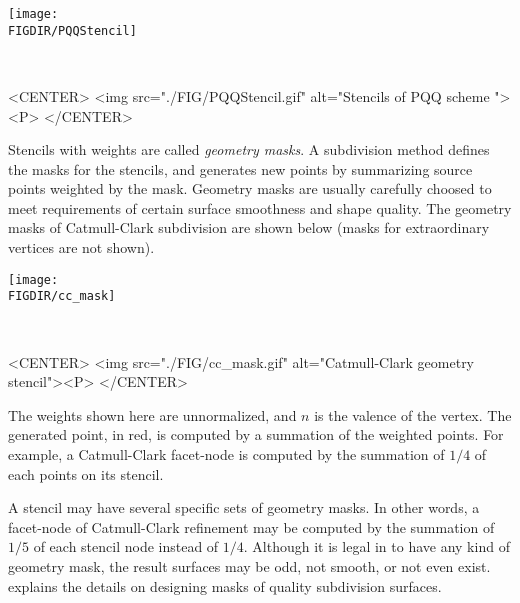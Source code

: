 \begin{ccTexOnly}
  \begin{center}
    \parbox{0.5\textwidth}{%
      \texttt{[image: \\FIGDIR/PQQStencil]}%
    }\\ \vspace{0.5cm}
  \end{center}
\end{ccTexOnly}

\begin{ccHtmlOnly}
  <CENTER>
     <img src="./FIG/PQQStencil.gif" alt="Stencils of PQQ scheme "><P>
  </CENTER>
\end{ccHtmlOnly}


Stencils with weights are called \emph{geometry masks}.
A subdivision method defines the masks for the stencils, and 
generates new points by summarizing source points weighted by the mask. 
Geometry masks are usually carefully choosed to meet requirements of 
certain surface smoothness and shape quality.
The geometry masks of Catmull-Clark subdivision are shown
below (masks for extraordinary vertices are not shown).  

\begin{ccTexOnly}
  \begin{center}
    \parbox{0.4\textwidth}{%
      \texttt{[image: \\FIGDIR/cc\_mask]}%
    } \\ \vspace{0.5cm}
  \end{center}
\end{ccTexOnly}

\begin{ccHtmlOnly}
  <CENTER>
     <img src="./FIG/cc_mask.gif" alt="Catmull-Clark geometry stencil"><P>
  </CENTER>
\end{ccHtmlOnly}

The weights shown here are unnormalized, and $n$ is the valence 
of the vertex. The generated point, in red, is computed by a summation
of the weighted points. For example, a Catmull-Clark facet-node is 
computed by the summation of $1/4$ of each points on its stencil.

A stencil may have several specific sets of geometry masks. In other 
words, a facet-node of Catmull-Clark refinement may be computed by 
the summation of $1/5$ of each stencil node instead of $1/4$. 
Although it is legal in  to have 
any kind of geometry mask, the result surfaces may be odd, 
not smooth, or not even exist. \cite{cgal:ww-smgd-02} explains the 
details on designing masks of quality subdivision surfaces.

